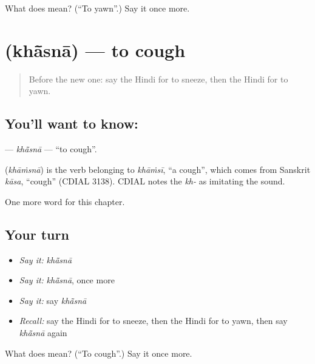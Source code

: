 \begin{tcolorbox}[breakable,colback=teal!4,colframe=teal!35!black,title={Before you move on}]
What does   mean? (\textquotedblleft{}To yawn\textquotedblright{}.) Say it once more.
\end{tcolorbox}
\section[\texorpdfstring{\hi{खाँसना} (khā̃snā)}{खाँसना (khā̃snā)}]{ (khā̃snā) — to cough}

\label{lesson:HI-C231-khasna}



\begin{quote}
Before the new one: say the Hindi for to sneeze, then the Hindi for to yawn.
\end{quote}

\subsection*{You'll want to know: }
\textbf{} — \emph{khā̃snā} — \textquotedblleft{}to cough\textquotedblright{}.

\begin{cousinweb}
\textbf{} (\emph{khāṁsnā}) is the verb belonging to \emph{khāṁsī}, \textquotedblleft{}a cough\textquotedblright{}, which comes from Sanskrit \emph{kāsa}, \textquotedblleft{}cough\textquotedblright{} (CDIAL 3138). CDIAL notes the \emph{kh-} as imitating the sound.
\end{cousinweb}

\begin{grammarlens}[title={What you've built}]
One more word for this chapter.
\end{grammarlens}

\subsection*{Your turn}
\begin{itemize}
\raggedright
  \item \emph{Say it:} \emph{khā̃snā}
  \item \emph{Say it:} \emph{khā̃snā}, once more
  \item \emph{Say it:} say \emph{khā̃snā}
  \item \emph{Recall:} say the Hindi for to sneeze, then the Hindi for to yawn, then say \emph{khā̃snā} again
\end{itemize}

\begin{tcolorbox}[breakable,colback=teal!4,colframe=teal!35!black,title={Before you move on}]
What does  mean? (\textquotedblleft{}To cough\textquotedblright{}.) Say it once more.
\end{tcolorbox}
